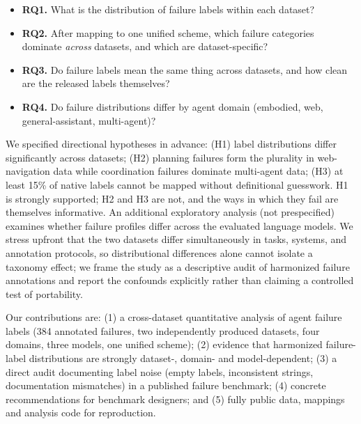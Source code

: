 \documentclass[12pt,letterpaper]{article}
\begin{document}
\begin{itemize}
\item \textbf{RQ1.} What is the distribution of failure labels within each dataset?
\item \textbf{RQ2.} After mapping to one unified scheme, which failure categories
dominate \emph{across} datasets, and which are dataset-specific?
\item \textbf{RQ3.} Do failure labels mean the same thing across datasets, and how
clean are the released labels themselves?
\item \textbf{RQ4.} Do failure distributions differ by agent domain (embodied, web,
general-assistant, multi-agent)?
\end{itemize}

We specified directional hypotheses in advance: (H1) label distributions differ
significantly across datasets; (H2) planning failures form the plurality in
web-navigation data while coordination failures dominate multi-agent data;
(H3) at least 15\% of native labels cannot be mapped without definitional
guesswork. H1 is strongly supported; H2 and H3 are not, and the ways in
which they fail are themselves informative. An additional exploratory analysis
(not prespecified) examines whether failure profiles differ across the
evaluated language models. We stress upfront that the two datasets differ
simultaneously in tasks, systems, and annotation protocols, so distributional
differences alone cannot isolate a taxonomy effect; we frame the study as a
descriptive audit of harmonized failure annotations and report the confounds
explicitly rather than claiming a controlled test of portability.

Our contributions are: (1) a cross-dataset quantitative analysis of
agent failure labels (384 annotated failures, two independently produced
datasets, four domains,
three models, one unified scheme); (2) evidence that harmonized
failure-label distributions are strongly dataset-, domain- and
model-dependent; (3) a
direct audit documenting label noise (empty labels, inconsistent strings,
documentation mismatches) in a published failure benchmark; (4) concrete
recommendations for benchmark designers; and (5) fully public data, mappings
and analysis code for reproduction.
\end{document}
